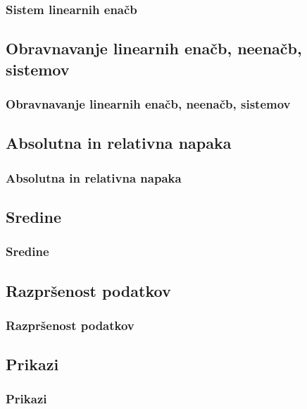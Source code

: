         \begin{frame}
            \frametitle{Sistem linearnih enačb}
        \end{frame}

    \subsection{Obravnavanje linearnih enačb, neenačb, sistemov}

        \begin{frame}
            \frametitle{Obravnavanje linearnih enačb, neenačb, sistemov}
        \end{frame}

    \subsection{Absolutna in relativna napaka}

        \begin{frame}
            \frametitle{Absolutna in relativna napaka}
        \end{frame}

    \subsection{Sredine}

        \begin{frame}
            \frametitle{Sredine}
        \end{frame}

    \subsection{Razpršenost podatkov}

        \begin{frame}
            \frametitle{Razpršenost podatkov}
        \end{frame}

    \subsection{Prikazi}
        
        \begin{frame}
            \frametitle{Prikazi}
        \end{frame}